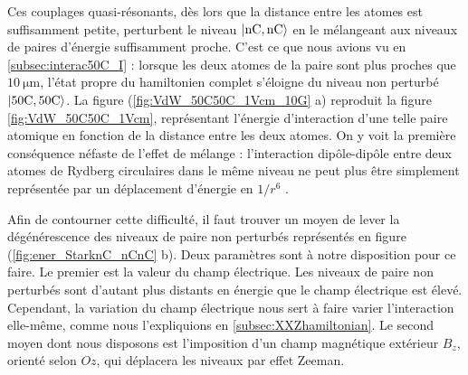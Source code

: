 Ces couplages quasi-résonants, dès lors que la distance entre les atomes est suffisamment petite, perturbent le niveau $\ket{\mathrm{nC,nC}}$ en le mélangeant aux niveaux de paires d'énergie suffisamment proche.
C'est ce que nous avions vu en \ref{subsec:interac50C_I} : lorsque les deux atomes de la paire sont plus proches que $\SI{10}{\um}$, l'état propre du hamiltonien complet s'éloigne du niveau non perturbé $\ket{\mathrm{50C,50C}}$.
La figure (\ref{fig:VdW_50C50C_1Vcm_10G} a) reproduit la figure \eqref{fig:VdW_50C50C_1Vcm}, représentant l'énergie d'interaction d'une telle paire atomique en fonction de la distance entre les deux atomes.
On y voit la première conséquence néfaste de l'effet de mélange : l'interaction dipôle-dipôle entre deux atomes de Rydberg circulaires dans le même niveau ne peut plus être simplement représentée par un déplacement d'énergie en $1/r^6$ .

Afin de contourner cette difficulté, il faut trouver un moyen de lever la dégénérescence des niveaux de paire non perturbés représentés en figure (\ref{fig:ener_StarknC_nCnC} b).
Deux paramètres sont à notre disposition pour ce faire.
Le premier est la valeur du champ électrique.
Les niveaux de paire non perturbés sont d'autant plus distants en énergie que le champ électrique est élevé.
Cependant, la variation du champ électrique nous sert à faire varier l'interaction elle-même, comme nous l'expliquions en \ref{subsec:XXZhamiltonian}.
Le second moyen dont nous disposons est l'imposition d'un champ magnétique extérieur $B_z$, orienté selon $Oz$, qui déplacera les niveaux par effet Zeeman.

